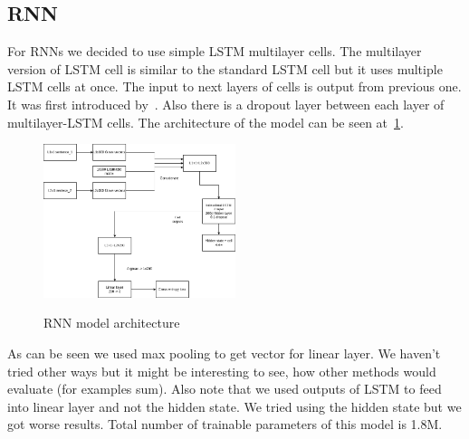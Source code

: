\documentclass{article}
\begin{document}
    \subsection{RNN}
    For RNNs we decided to use simple LSTM multilayer cells.
    The multilayer version of LSTM cell is similar to the standard LSTM cell but it uses multiple LSTM cells at once.
    The input to next layers of cells is output from previous one. It was first introduced by~\cite{gravesSpeechRecognitionDeep2013}.
    Also there is a dropout layer between each layer of multilayer-LSTM cells.
    The architecture of the model can be seen at~\ref{fig:rnn_model}.\\
    \begin{figure}[h!]
        \centering
        \includegraphics[width=0.5\textwidth]{LSTM.png}\label{fig:rnn_model}
        \caption{RNN model architecture}
    \end{figure}
    As can be seen we used max pooling to get vector for linear layer.
    We haven't tried other ways but it might be interesting to see, how other methods would evaluate (for examples sum).
    Also note that we used outputs of LSTM to feed into linear layer and not the hidden state.
    We tried using the hidden state but we got worse results.
    Total number of trainable parameters of this model is 1.8M.
\end{document}
